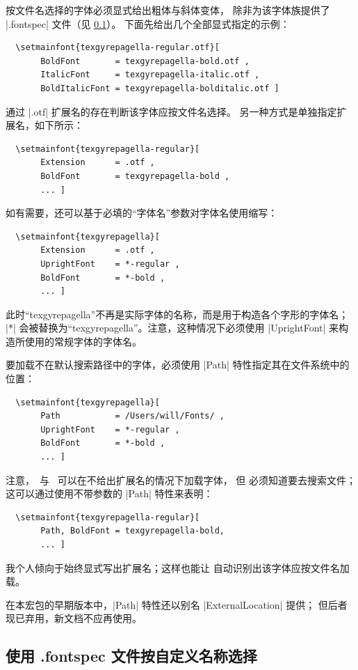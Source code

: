 \documentclass[a4paper]{l3doc}
\begin{document}
按文件名选择的字体必须显式给出粗体与斜体变体，
除非为该字体族提供了 |.fontspec| 文件（见 \ref{sec:fontspecfile}）。
下面先给出几个全部显式指定的示例：
\begin{Verbatim}
  \setmainfont{texgyrepagella-regular.otf}[
       BoldFont       = texgyrepagella-bold.otf ,
       ItalicFont     = texgyrepagella-italic.otf ,
       BoldItalicFont = texgyrepagella-bolditalic.otf ]
\end{Verbatim}
 通过 |.otf| 扩展名的存在判断该字体应按文件名选择。
另一种方式是单独指定扩展名，如下所示：
\begin{Verbatim}
  \setmainfont{texgyrepagella-regular}[
       Extension      = .otf ,
       BoldFont       = texgyrepagella-bold ,
       ... ]
\end{Verbatim}
如有需要，还可以基于必填的“字体名”参数对字体名使用缩写：
\begin{Verbatim}
  \setmainfont{texgyrepagella}[
       Extension      = .otf ,
       UprightFont    = *-regular ,
       BoldFont       = *-bold ,
       ... ]
\end{Verbatim}
此时“texgyrepagella”不再是实际字体的名称，而是用于构造各个字形的字体名；
|*| 会被替换为“texgyrepagella”。注意，这种情况下必须使用 |UprightFont|
来构造所使用的常规字体的字体名。

要加载不在默认搜索路径中的字体，必须使用 |Path| 特性指定其在文件系统中的位置：
\begin{Verbatim}
  \setmainfont{texgyrepagella}[
       Path           = /Users/will/Fonts/ ,
       UprightFont    = *-regular ,
       BoldFont       = *-bold ,
       ... ]
\end{Verbatim}
注意，\XeTeX\ 与 \LuaTeX\ 可以在不给出扩展名的情况下加载字体，
但  必须知道要去搜索文件；这可以通过使用不带参数的
|Path| 特性来表明：
\begin{Verbatim}
  \setmainfont{texgyrepagella-regular}[
       Path, BoldFont = texgyrepagella-bold,
       ... ]
\end{Verbatim}
我个人倾向于始终显式写出扩展名；这样也能让 
自动识别出该字体应按文件名加载。

在本宏包的早期版本中，|Path| 特性还以别名 |ExternalLocation| 提供；
但后者现已弃用，新文档不应再使用。


\subsection{使用 .fontspec 文件按自定义名称选择}
\label{sec:fontspecfile}
\end{document}
